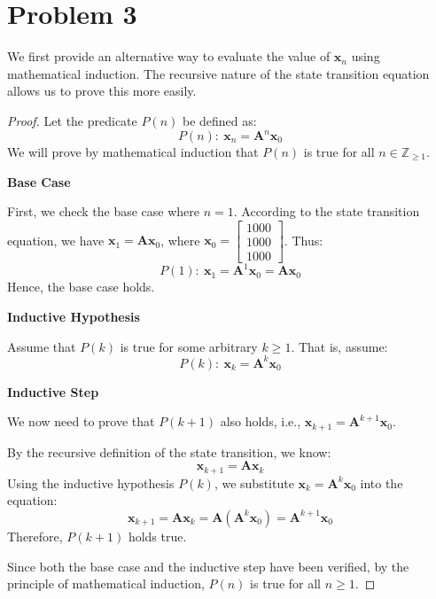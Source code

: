 \documentclass[12pt,a4paper]{article}
\begin{document}
\section*{Problem 3}
\begin{solution}
We first provide an alternative way to evaluate the value of $\mathbf{x}_n$ using mathematical induction. The recursive nature of the state transition equation allows us to prove this more easily.

\begin{proof}
    Let the predicate \( P(n) \) be defined as:
    \[
    P(n):\ \mathbf{x}_n = \mathbf{A}^n \mathbf{x}_0
    \]
    We will prove by mathematical induction that \( P(n) \) is true for all \( n \in \mathbb{Z}_{\geq 1} \).

    \textbf{Base Case}

    First, we check the base case where \( n = 1 \). According to the state transition equation, we have \( \mathbf{x}_1 = \mathbf{A} \mathbf{x}_0 \), where \( \mathbf{x}_0 = \begin{bmatrix}1000 \\ 1000 \\ 1000\end{bmatrix} \). Thus:
    \[
    P(1):\ \mathbf{x}_1 = \mathbf{A}^1 \mathbf{x}_0 = \mathbf{A} \mathbf{x}_0
    \]
    Hence, the base case holds.

    \textbf{Inductive Hypothesis}
    
    Assume that \( P(k) \) is true for some arbitrary \( k \geq 1 \). That is, assume:
    \[
    P(k):\ \mathbf{x}_k = \mathbf{A}^k \mathbf{x}_0
    \]

    \textbf{Inductive Step}
    
    We now need to prove that \( P(k+1) \) also holds, i.e., \( \mathbf{x}_{k+1} = \mathbf{A}^{k+1} \mathbf{x}_0 \).

    By the recursive definition of the state transition, we know:
    \[
    \mathbf{x}_{k+1} = \mathbf{A} \mathbf{x}_k
    \]
    Using the inductive hypothesis \( P(k) \), we substitute \( \mathbf{x}_k = \mathbf{A}^k \mathbf{x}_0 \) into the equation:
    \[
    \mathbf{x}_{k+1} = \mathbf{A} \mathbf{x}_k = \mathbf{A} (\mathbf{A}^k \mathbf{x}_0) = \mathbf{A}^{k+1} \mathbf{x}_0
    \]
    Therefore, \( P(k+1) \) holds true.

    Since both the base case and the inductive step have been verified, by the principle of mathematical induction, \( P(n) \) is true for all \( n \geq 1 \).
\end{proof}


\end{solution}
\end{document}
